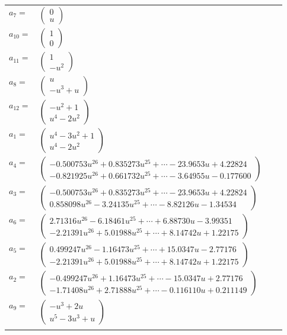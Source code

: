 \documentclass[1p]{elsarticle_modified}
\theoremstyle{definition}
\begin{document}
\begin{tabular}{m{7pt} m{180pt} m{7pt} m{180pt} }
\flushright $a_{7}=$&$\begin{pmatrix}0\\u\end{pmatrix}$ \\
\flushright $a_{10}=$&$\begin{pmatrix}1\\0\end{pmatrix}$ \\
\flushright $a_{11}=$&$\begin{pmatrix}1\\- u^2\end{pmatrix}$ \\
\flushright $a_{8}=$&$\begin{pmatrix}u\\- u^3+u\end{pmatrix}$ \\
\flushright $a_{12}=$&$\begin{pmatrix}- u^2+1\\u^4-2 u^2\end{pmatrix}$ \\
\flushright $a_{1}=$&$\begin{pmatrix}u^4-3 u^2+1\\u^4-2 u^2\end{pmatrix}$ \\
\flushright $a_{4}=$&$\begin{pmatrix}-0.500753 u^{26}+0.835273 u^{25}+\cdots-23.9653 u+4.22824\\-0.821925 u^{26}+0.661732 u^{25}+\cdots-3.64955 u-0.177600\end{pmatrix}$ \\
\flushright $a_{3}=$&$\begin{pmatrix}-0.500753 u^{26}+0.835273 u^{25}+\cdots-23.9653 u+4.22824\\0.858098 u^{26}-3.24135 u^{25}+\cdots-8.82126 u-1.34534\end{pmatrix}$ \\
\flushright $a_{6}=$&$\begin{pmatrix}2.71316 u^{26}-6.18461 u^{25}+\cdots+6.88730 u-3.99351\\-2.21391 u^{26}+5.01988 u^{25}+\cdots+8.14742 u+1.22175\end{pmatrix}$ \\
\flushright $a_{5}=$&$\begin{pmatrix}0.499247 u^{26}-1.16473 u^{25}+\cdots+15.0347 u-2.77176\\-2.21391 u^{26}+5.01988 u^{25}+\cdots+8.14742 u+1.22175\end{pmatrix}$ \\
\flushright $a_{2}=$&$\begin{pmatrix}-0.499247 u^{26}+1.16473 u^{25}+\cdots-15.0347 u+2.77176\\-1.71408 u^{26}+2.71888 u^{25}+\cdots-0.116110 u+0.211149\end{pmatrix}$ \\
\flushright $a_{9}=$&$\begin{pmatrix}- u^3+2 u\\u^5-3 u^3+u\end{pmatrix}$\\&\end{tabular}
\end{document}
